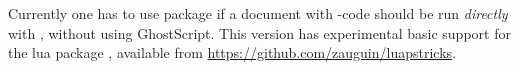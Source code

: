 \documentclass[11pt,english,BCOR=10mm,DIV=12,bibliography=totoc,parskip=false,headings=small,
    headinclude=false,footinclude=false,twoside,usegeometry]{pst-doc}
\begin{document}
\fi


\section{\LuaLaTeX}\label{lua}
Currently one has to use package  if a document with
\PSTricks-code should be run \emph{directly} with  \LuaLaTeX, without using
GhostScript. This version has experimental basic support for the lua package
, available from \url{https://github.com/zauguin/luapstricks}.

\nocite{*}
\printbibliography
\end{document}
